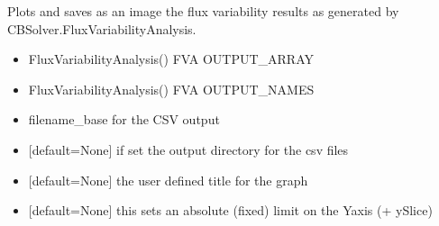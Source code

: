 \documentclass[letterpaper,10pt,english]{sphinxmanual}
\begin{document}
\begin{fulllineitems}
\label{\detokenize{modules_doc:cbmpy.CBPlot.plotFluxVariability}}
\pysigstartsignatures
{}
\pysigstopsignatures
\sphinxAtStartPar
Plots and saves as an image the flux variability results as generated by CBSolver.FluxVariabilityAnalysis.
\begin{itemize}
\item {} 
\sphinxAtStartPar
{} FluxVariabilityAnalysis() FVA OUTPUT\_ARRAY

\item {} 
\sphinxAtStartPar
{} FluxVariabilityAnalysis() FVA OUTPUT\_NAMES

\item {} 
\sphinxAtStartPar
{} filename\_base for the CSV output

\item {} 
\sphinxAtStartPar
{} {[}default=None{]} if set the output directory for the csv files

\item {} 
\sphinxAtStartPar
{} {[}default=None{]} the user defined title for the graph

\item {} 
\sphinxAtStartPar
{} {[}default=None{]} this sets an absolute (fixed) limit on the Y\sphinxhyphen{}axis (+\sphinxhyphen{} ySlice)


\end{itemize}
\end{fulllineitems}
\end{document}

